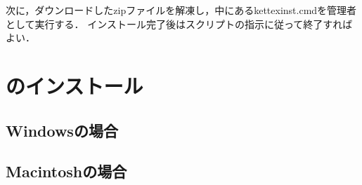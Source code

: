 次に，ダウンロードしたzipファイルを解凍し，中にあるkettexinst.cmdを管理者として実行する．
インストール完了後はスクリプトの指示に従って終了すればよい．

\section{{\ketcindy}のインストール}

\subsection{Windowsの場合}

\subsection{Macintoshの場合}

